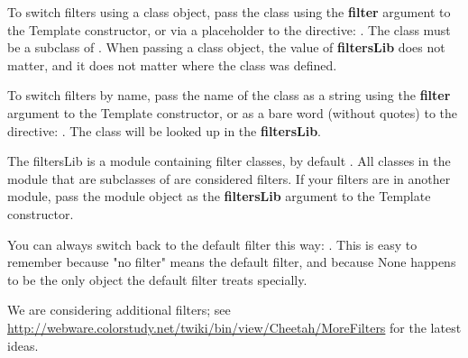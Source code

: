 To switch filters using a class object, pass the class using the
{\bf filter} argument to the Template constructor, or via a placeholder to the
 directive: .  The class must be
a subclass of .  When passing a class object, the
value of {\bf filtersLib} does not matter, and it does not matter where the
class was defined.

To switch filters by name, pass the name of the class as a string using the
{\bf filter} argument to the Template constructor, or as a bare word (without
quotes) to the  directive: .  The
class will be looked up in the {\bf filtersLib}.

The filtersLib is a module containing filter classes, by default
.  All classes in the module that are subclasses of
 are considered filters.  If your filters are in
another module, pass the module object as the {\bf filtersLib} argument to the
Template constructor.

You can always switch back to the default filter this way:
.  This is easy to remember because "no filter" means the
default filter, and because None happens to be the only object the default
filter treats specially.

We are considering additional filters; see
\url{http://webware.colorstudy.net/twiki/bin/view/Cheetah/MoreFilters}
for the latest ideas.






